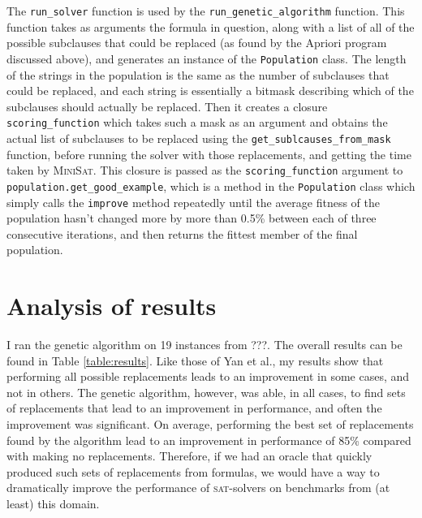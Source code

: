 \documentclass[proof,pdftex,11pt,a4,titlepage]{article}
\def\code{\lstinline[basicstyle=\textsize\ttfamily]}
\newcommand{\sat}{\textsc{sat}}
\begin{document}
The \code{run_solver} function is used by the \code{run_genetic_algorithm} function. This function takes as arguments the formula in question, along with a list of all of the possible subclauses that could be replaced (as found by the Apriori program discussed above), and generates an instance of the \code{Population} class. The length of the strings in the population is the same as the number of subclauses that could be replaced, and each string is essentially a bitmask describing which of the subclauses should actually be replaced. Then it creates a closure \code{scoring_function} which takes such a mask as an argument and obtains the actual list of subclauses to be replaced using the \code{get_sublcauses_from_mask} function, before running the solver with those replacements, and getting the time taken by \textsc{MiniSat}. This closure is passed as the \code{scoring_function} argument to \code{population.get_good_example}, which is a method in the \code{Population} class which simply calls the \code{improve} method repeatedly until the average fitness of the population hasn't changed more by more than 0.5\% between each of three consecutive iterations, and then returns the fittest member of the final population.

\section{Analysis of results}

I ran the genetic algorithm on 19 instances from ???. The overall results can be found in Table \ref{table:results}. Like those of Yan et al., my results show that performing all possible replacements leads to an improvement in some cases, and not in others. The genetic algorithm, however, was able, in all cases, to find sets of replacements that lead to an improvement in performance, and often the improvement was significant. On average, performing the best set of replacements found by the algorithm lead to an improvement in performance of 85\% compared with making no replacements. Therefore, if we had an oracle that quickly produced such sets of replacements from formulas, we would have a way to dramatically improve the performance of \sat{}-solvers on benchmarks from (at least) this domain.
\end{document}
